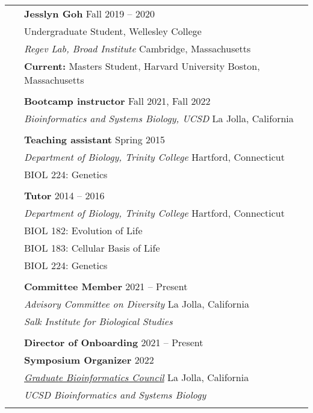\documentclass[letterpaper, 11pt]{article}
\begin{document}
\begin{longtable}{p{1.6in}p{4.9in}}
& \textbf{Jesslyn Goh} \hfill Fall 2019 -- 2020 \\
& Undergraduate Student, Wellesley College \\
& \textit{Regev Lab, Broad Institute} \hfill Cambridge, Massachusetts \\
& \textbf{Current:} Masters Student, Harvard University \hfill Boston, Massachusetts \\
& \\
  

{\color{OliveGreen}{Teaching}} 
& \textbf{Bootcamp instructor} \hfill Fall 2021, Fall 2022 \\\
& \textit{Bioinformatics and Systems Biology, UCSD} \hfill La Jolla, California \\
& \\

& \textbf{Teaching assistant} \hfill Spring 2015 \\
& \textit{Department of Biology, Trinity College} \hfill Hartford, Connecticut \\
& BIOL 224: Genetics \\
& \\

& \textbf{Tutor} \hfill 2014 -- 2016 \\
& \textit{Department of Biology, Trinity College} \hfill Hartford, Connecticut \\
& BIOL 182: Evolution of Life \\
& BIOL 183: Cellular Basis of Life \\
& BIOL 224: Genetics \\
& \\



{\color{OliveGreen}{Service / Outreach}}
& \textbf{Committee Member} \hfill 2021 -- Present \\
& \textit{Advisory Committee on Diversity} \hfill La Jolla, California \\
& \textit{Salk Institute for Biological Studies} \\
& \\

& \textbf{Director of Onboarding} \hfill 2021 -- Present \\
& \textbf{Symposium Organizer} \hfill 2022 \\
& \href{https://gbic.ucsd.edu/}{\textit{Graduate Bioinformatics Council}} \hfill La Jolla, California \\
& \textit{UCSD Bioinformatics and Systems Biology} \\
& \\


\end{longtable}
\end{document}
